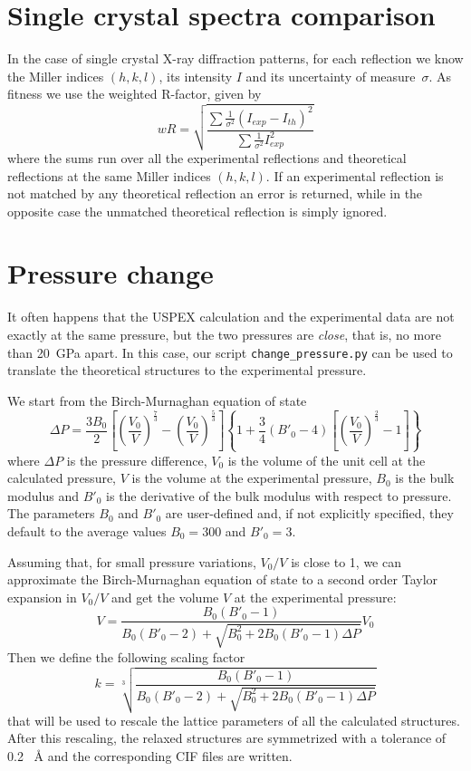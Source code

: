 \documentclass{article}
\begin{document}
\section{Single crystal spectra comparison}
\label{sec:scspectracomp}

In the case of single crystal X-ray diffraction patterns, for each reflection we know the Miller indices $(h, k, l)$, its intensity $I$ and its uncertainty of measure~$\sigma$. As fitness we use the weighted R-factor, given by
\[
	wR = \sqrt{\frac{\sum \frac{1}{\sigma^2} (I_{exp} - I_{th})^2}{\sum \frac{1}{\sigma^2} I_{exp}^2}}
\]
where the sums run over all the experimental reflections and theoretical reflections at the same Miller indices $(h, k, l)$. If an experimental reflection is not matched by any theoretical reflection an error is returned, while in the opposite case the unmatched theoretical reflection is simply ignored.

\section{Pressure change}
\label{sec:birchmurnaghan}

It often happens that the USPEX calculation and the experimental data are not exactly at the same pressure, but the two pressures are \emph{close}, that is, no more than \SI{20}{GPa} apart. In this case, our script \texttt{change\_pressure.py} can be used to translate the theoretical structures to the experimental pressure.

We start from the Birch-Murnaghan equation of state
\begin{equation*}
	\Delta P = \frac{3 B_0}{2} \left[ \left( \frac{V_0}{V} \right)^{\frac{7}{3}} - \left( \frac{V_0}{V} \right)^{\frac{5}{3}} \right] \left\{ 1 + \frac{3}{4} \left( B'_0 - 4 \right) \left[ \left( \frac{V_0}{V} \right)^{\frac{2}{3}} - 1 \right] \right\}
\end{equation*}
where $\Delta P$ is the pressure difference, $V_0$ is the volume of the unit cell at the calculated pressure, $V$ is the volume at the experimental pressure, $B_0$ is the bulk modulus and $B'_0$ is the derivative of the bulk modulus with respect to pressure. The parameters $B_0$ and $B'_0$ are user-defined and, if not explicitly specified, they default to the average values $B_0 = 300$ and $B'_0 = 3$.

Assuming that, for small pressure variations, $V_0/V$ is close to 1, we can approximate the Birch-Murnaghan equation of state to a second order Taylor expansion in $V_0/V$ and get the volume $V$ at the experimental pressure:
\begin{equation*}
	V = \frac{B_0 (B'_0 - 1)}{B_0 (B'_0 - 2) + \sqrt{B_0^2 + 2 B_0 (B'_0 - 1) \Delta P}} V_0
\end{equation*}
Then we define the following scaling factor
\begin{equation*}
	k = \sqrt[3]{\frac{B_0 (B'_0 - 1)}{B_0 (B'_0 - 2) + \sqrt{B_0^2 + 2 B_0 (B'_0 - 1) \Delta P}}}
\end{equation*}
that will be used to rescale the lattice parameters of all the calculated structures. After this rescaling, the relaxed structures are symmetrized with a tolerance of 0.2 \SI{}{\angstrom} and the corresponding CIF files are written.
\end{document}
